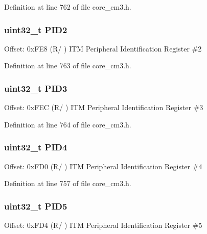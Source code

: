 Definition at line 762 of file core\+\_\+cm3.\+h.

\subsubsection[{\texorpdfstring{P\+I\+D2}{PID2}}]{ uint32\+\_\+t P\+I\+D2}\hypertarget{struct_i_t_m___type_a63db39f871596d28e69c283288ea2eba}{}\label{struct_i_t_m___type_a63db39f871596d28e69c283288ea2eba}
Offset\+: 0x\+F\+E8 (R/ ) I\+TM Peripheral Identification Register \#2 

Definition at line 763 of file core\+\_\+cm3.\+h.

\subsubsection[{\texorpdfstring{P\+I\+D3}{PID3}}]{ uint32\+\_\+t P\+I\+D3}\hypertarget{struct_i_t_m___type_ac2d006eed52ba550a309e5f61ed9c401}{}\label{struct_i_t_m___type_ac2d006eed52ba550a309e5f61ed9c401}
Offset\+: 0x\+F\+EC (R/ ) I\+TM Peripheral Identification Register \#3 

Definition at line 764 of file core\+\_\+cm3.\+h.

\subsubsection[{\texorpdfstring{P\+I\+D4}{PID4}}]{ uint32\+\_\+t P\+I\+D4}\hypertarget{struct_i_t_m___type_a4c002e97cda2375d7421ad6415b6a02f}{}\label{struct_i_t_m___type_a4c002e97cda2375d7421ad6415b6a02f}
Offset\+: 0x\+F\+D0 (R/ ) I\+TM Peripheral Identification Register \#4 

Definition at line 757 of file core\+\_\+cm3.\+h.

\subsubsection[{\texorpdfstring{P\+I\+D5}{PID5}}]{ uint32\+\_\+t P\+I\+D5}\hypertarget{struct_i_t_m___type_ac085b26f43fefeef9a4cf5c2af5e4a38}{}\label{struct_i_t_m___type_ac085b26f43fefeef9a4cf5c2af5e4a38}
Offset\+: 0x\+F\+D4 (R/ ) I\+TM Peripheral Identification Register \#5 

